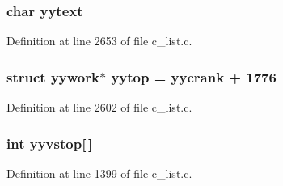 \subsubsection{\setlength{\rightskip}{0pt plus 5cm}char \bf{yytext}}\label{c__list_8c_fbb25031187fb969b43dc8d9adc918e5}




Definition at line 2653 of file c\_\-list.c.
\subsubsection{\setlength{\rightskip}{0pt plus 5cm}struct \bf{yywork}$\ast$ \bf{yytop} = \bf{yycrank} + 1776}\label{c__list_8c_a50ced6fc1dcd0ac66c184ddbc4ebca7}




Definition at line 2602 of file c\_\-list.c.
\subsubsection{\setlength{\rightskip}{0pt plus 5cm}int \bf{yyvstop}[$\,$]}\label{c__list_8c_9cb00a23aa4d95b81cc33535ad4b1d49}




Definition at line 1399 of file c\_\-list.c.